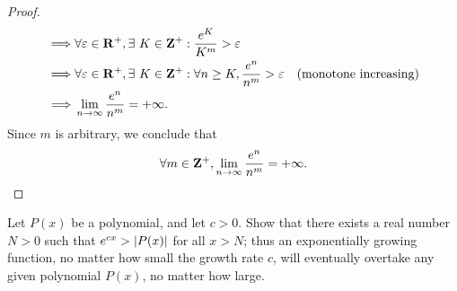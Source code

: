 \begin{proof}
\begin{align*}
        \implies & \forall \varepsilon \in \mathbf{R}^+, \exists\ K \in \mathbf{Z}^+ : \frac{e^K}{K^m} > \varepsilon                                                                          \\
        \implies & \forall \varepsilon \in \mathbf{R}^+, \exists\ K \in \mathbf{Z}^+ : \forall n \geq K, \frac{e^n}{n^m} > \varepsilon                         & \text{(monotone increasing)} \\
        \implies & \lim_{n \to \infty} \frac{e^n}{n^m} = +\infty.
    \end{align*}
    Since \(m\) is arbitrary, we conclude that
    \[
        \forall m \in \mathbf{Z}^+, \lim_{n \to \infty} \frac{e^n}{n^m} = +\infty.
    \]
\end{proof}

\begin{exercise}\label{ex 4.5.9}
    Let \(P(x)\) be a polynomial, and let \(c > 0\).
    Show that there exists a real number \(N > 0\) such that \(e^{cx} > \left\lvert P(x)\right\rvert\) for all \(x > N\);
    thus an exponentially growing function, no matter how small the growth rate \(c\), will eventually overtake any given polynomial \(P(x)\), no matter how large.
\end{exercise}


